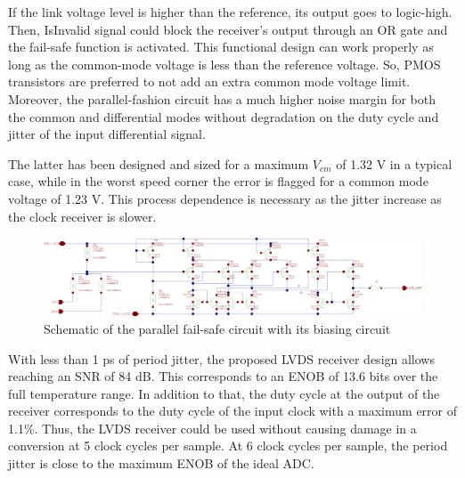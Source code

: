 If the link voltage level is higher than the reference, its output goes to logic-high. Then, IsInvalid signal could block the receiver's output through an OR gate and the fail-safe function is activated. This functional design can work properly as long as the common-mode voltage is less than the reference voltage. So, PMOS transistors are preferred to not add an extra common mode voltage limit. Moreover, the parallel-fashion circuit has a much higher noise margin for both the common and differential modes without degradation on the duty cycle and jitter of the input differential signal.

The latter has been designed and sized for a maximum $V_{cm}$ of 1.32 V in a typical case, while in the worst speed corner the error is flagged for a common mode voltage of 1.23 V. This process dependence is necessary as the jitter increase as the clock receiver is slower.

\begin{figure}[htp]
    \centering
    \includegraphics[width=\textwidth]{Chapter5/Figs/adc_chip/lvds-failsafe.png}
    \caption{Schematic of the parallel fail-safe circuit with its biasing circuit}
    \label{}
\end{figure}

With less than 1 ps of period jitter, the proposed LVDS receiver design allows reaching an SNR of 84 dB. This corresponds to an ENOB of 13.6 bits over the full temperature range. In addition to that, the duty cycle at the output of the receiver corresponds to the duty cycle of the input clock with a maximum error of 1.1\%. Thus, the LVDS receiver could be used without causing damage in a conversion at 5 clock cycles per sample. At 6 clock cycles per sample, the period jitter is close to the maximum ENOB of the ideal ADC\@.

